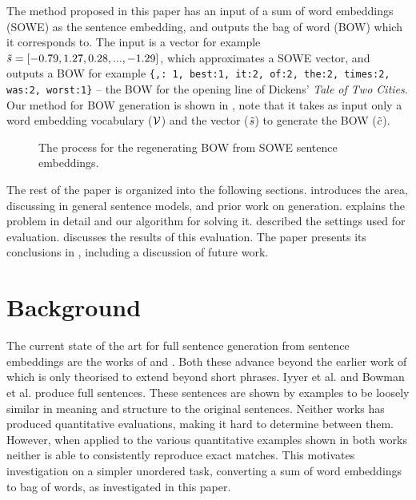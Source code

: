 \documentclass{book}
\begin{document}
The method proposed in this paper has an input of a sum of word embeddings (SOWE) as the sentence embedding, and outputs the bag of word (BOW) which it corresponds to. The input is a vector for example $\tilde{s}=[-0.79, 1.27,0.28,...,-1.29]$, which approximates a SOWE vector, and outputs a BOW for example \texttt{\{\mbox{,: 1}, \mbox{best:1}, \mbox{it:2}, \mbox{of:2}, \mbox{the:2}, \mbox{times:2}, \mbox{was:2}, \mbox{worst:1}\}} -- the BOW for the opening line of Dickens' \emph{Tale of Two Cities}. Our method for BOW generation is shown in , note that it takes as input only a word embedding vocabulary ($\mathcal{V}$) and the vector ($\tilde{s}$) to generate the BOW ($\tilde{c}$). 

\begin{figure}
	\centering 
	
	\caption{The process for the regenerating BOW from SOWE sentence embeddings.}
	\label{block_diagram}
\end{figure}

The rest of the paper is organized into the following sections.  introduces the area, discussing in general sentence models, and prior work on generation.  explains the problem in detail and our algorithm for solving it.  described the settings used for evaluation.  discusses the results of this evaluation. The paper presents its conclusions in , including a discussion of future work.


\section{Background}\label{relwork}

The current state of the art for full sentence generation from sentence embeddings are the works of \cite{iyyer2014generating} and \cite{Bowman2015SmoothGeneration}. Both these advance beyond the earlier work of \cite{Dinu2014CompositionalGeneration} which is only theorised to extend beyond short phrases. Iyyer et al. and Bowman et al. produce full sentences. These sentences are shown by examples to be loosely similar in meaning and structure to the original sentences. Neither works has produced quantitative evaluations, making it hard to determine between them. However, when applied to the various quantitative examples shown in both works neither is able to consistently reproduce exact matches. This motivates investigation on a simpler unordered task, converting a sum of word embeddings to bag of words, as investigated in this paper.
\end{document}
